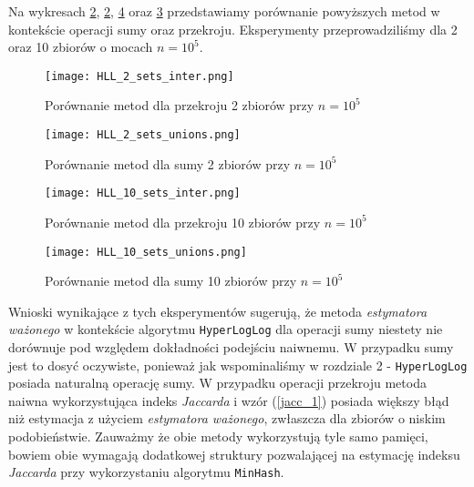 Na wykresach \ref{fig:HLL_2_sets_unions}, \ref{fig:HLL_2_sets_unions}, \ref{fig:HLL_10_sets_unions} oraz \ref{fig:HLL_10_sets_inter} przedstawiamy porównanie powyższych metod w kontekście operacji sumy oraz przekroju. Eksperymenty przeprowadziliśmy dla 2 oraz 10 zbiorów o mocach $n=10^5$.

\begin{figure}[h!]
	\texttt{[image: HLL\_2\_sets\_inter.png]}
	\centering
	\caption{Porównanie metod dla przekroju 2 zbiorów przy $n=10^5$}
	\label{fig:HLL_2_sets_inter}
\end{figure}

\begin{figure}[h!]
	\texttt{[image: HLL\_2\_sets\_unions.png]}
	\centering
	\caption{Porównanie metod dla sumy 2 zbiorów przy $n=10^5$}
	\label{fig:HLL_2_sets_unions}
\end{figure}

\begin{figure}[h!]
    \texttt{[image: HLL\_10\_sets\_inter.png]}
    \centering
    \caption{Porównanie metod dla przekroju 10 zbiorów przy $n=10^5$}
    \label{fig:HLL_10_sets_inter}
\end{figure}

\begin{figure}[h!]
    \texttt{[image: HLL\_10\_sets\_unions.png]}
    \centering
    \caption{Porównanie metod dla sumy 10 zbiorów przy $n=10^5$}
    \label{fig:HLL_10_sets_unions}
\end{figure}

Wnioski wynikające z tych eksperymentów sugerują, że metoda \textit{estymatora ważonego} w kontekście algorytmu \texttt{HyperLogLog} dla operacji sumy niestety nie dorównuje pod względem dokładności podejściu naiwnemu. W przypadku sumy jest to dosyć oczywiste, ponieważ jak wspominaliśmy w rozdziale 2 - \texttt{HyperLogLog} posiada naturalną operację sumy. W przypadku operacji przekroju metoda naiwna wykorzystująca indeks \textit{Jaccarda} i wzór (\ref{jacc_1}) posiada większy błąd niż estymacja z użyciem \textit{estymatora ważonego}, zwłaszcza dla zbiorów o niskim podobieństwie. Zauważmy że obie metody wykorzystują tyle samo pamięci, bowiem obie wymagają dodatkowej struktury pozwalającej na estymację indeksu \textit{Jaccarda} przy wykorzystaniu algorytmu \texttt{MinHash}.